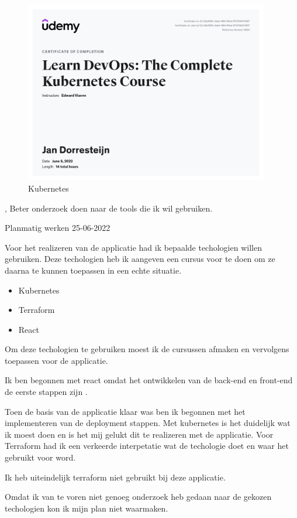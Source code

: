 {{\begin{figure}[H]
\begin{center}
				\includegraphics[width=0.95\textwidth]{images/kube.jpg}
			\end{center}
			\caption{Kubernetes}
			\label{fig:kubernets}
		\end{figure}

	},
	\bewijs
	{%
		Beter onderzoek doen naar de tools die ik wil gebruiken.
	}
	{%
		\starr
		{%
			Planmatig werken
		}
		{%
			25-06-2022
		}
		{%
			Voor het realizeren van de applicatie had ik bepaalde techologien willen gebruiken.
			Deze techologien heb ik aangeven een cursus voor te doen om ze daarna te kunnen toepassen in een echte situatie.
			\begin{itemize}
				\item Kubernetes
				\item Terraform
				\item React
			\end{itemize}
		}
		{%
			Om deze techologien te gebruiken moest ik de cursussen afmaken en vervolgens toepassen voor de applicatie.
		}
		{%
			Ik ben begonnen met react omdat het ontwikkelen van de back-end en front-end de eerste stappen zijn .

			Toen de basis van de applicatie klaar was ben ik begonnen met het implementeren van de deployment stappen.
			Met kubernetes is het duidelijk wat ik moest doen en is het mij gelukt dit te realizeren met de applicatie.
			Voor Terraform had ik een verkeerde interpetatie wat de techologie doet en waar het gebruikt voor word.

			Ik heb uiteindelijk terraform niet gebruikt bij deze applicatie.

		}
		{%
			Omdat ik van te voren niet genoeg onderzoek heb gedaan naar de gekozen techologien kon ik mijn plan niet waarmaken.

}}}
